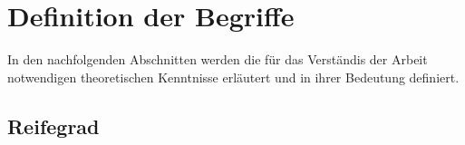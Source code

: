 \newpage
\section{Definition der Begriffe}

In den nachfolgenden Abschnitten werden die für das Verständis der Arbeit notwendigen theoretischen Kenntnisse erläutert und
in ihrer Bedeutung definiert.

\subsection{Reifegrad}


